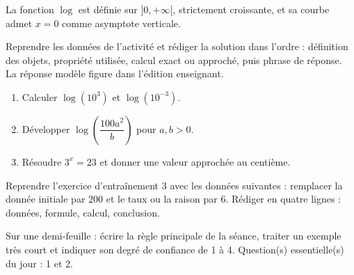 \begin{traceecrite}La fonction $\log$ est définie sur $]0,+\infty[$, strictement croissante, et sa courbe admet $x=0$ comme asymptote verticale.\end{traceecrite}

\begin{exemple}
Reprendre les données de l'activité et rédiger la solution dans l'ordre : définition des objets, propriété utilisée, calcul exact ou approché, puis phrase de réponse. La réponse modèle figure dans l'édition enseignant.
\end{exemple}
\enseignant{Le logarithme est la fonction réciproque de $10^x$ : domaine $]0,+\infty[$, croissance stricte, asymptote $x=0$.}

\begin{exercice}[-- essentiel]
\begin{enumerate}\item Calculer $\log(10^3)$ et $\log(10^{-3})$.\item Développer $\log\!\left(\dfrac{100a^2}{b}\right)$ pour $a,b>0$.\item Résoudre $3^x=23$ et donner une valeur approchée au centième.\end{enumerate}
\end{exercice}


\begin{dm}Reprendre l'exercice d'entraînement 3 avec les données suivantes : remplacer la donnée initiale par $200$ et le taux ou la raison par $6$. Rédiger en quatre lignes : données, formule, calcul, conclusion.\end{dm}

\begin{sortie}Sur une demi-feuille : écrire la règle principale de la séance, traiter un exemple très court et indiquer son degré de confiance de 1 à 4. Question(s) essentielle(s) du jour : 1 et 2.\end{sortie}

